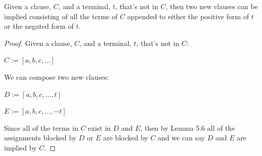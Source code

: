 \documentclass[manuscript]{acmart}
\begin{document}
    \begin{lemma}[Expansion]
        Given a clause, $C$, and a terminal, $t$, that's not in $C$, then two new clauses can be implied consisting of all the terms of $C$ appended to either the positive form of $t$ or the negated form of $t$.
    \end{lemma}
    \begin{proof}
        Given a clause, $C$, and a terminal, $t$, that's not in $C$:

        $C := [a, b, c, ...]$

        We can compose two new clauses:

        $D := [a, b, c, ..., t]$

        $E := [a, b, c, ..., -t]$

        Since all of the terms in $C$ exist in $D$ and $E$, then by Lemma 5.6 all of the assignments blocked by $D$ or $E$ are blocked by $C$ and we can say $D$ and $E$ are implied by $C$.   
    \end{proof}
\end{document}
